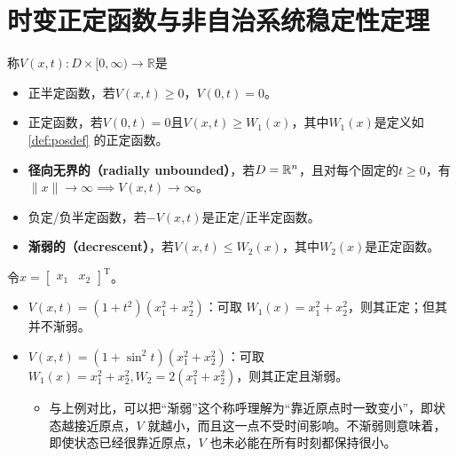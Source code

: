 \section{时变正定函数与非自治系统稳定性定理}\label{3Cref}
\begin{definition}
称$V(x,t): D \times [0, \infty) \rightarrow \mathbb{R}$是
    \begin{itemize}[leftmargin=1em]
      \item 正半定函数，若$V(x,t)\ge 0$，$V(0,t)=0$。
      \item 正定函数，若$V(0,t)=0$且$V(x,t)\ge W_1(x)$，其中$W_1(x)$是定义如 \ref{def:posdef} 的正定函数。
      \item {\bf 径向无界的（radially unbounded）}，若$D=\mathbb{R}{}^n$，且对每个固定的$t\ge0$，有$\|x\|\to\infty\implies V(x,t)\to\infty$。
      \item 负定/负半定函数，若$-V(x,t)$是正定/正半定函数。
      \item {\bf 渐弱的（decrescent）}，若$V(x,t)\le W_2(x)$，其中$W_2(x)$是正定函数。
    \end{itemize}
\end{definition}
\begin{example}[正定与渐弱]
    令$x = [\begin{array}{cc}
    x_1& x_2
  \end{array}]^\mathrm{T}$。
  \begin{itemize}[leftmargin=1em]
    \item $V (x, t) = (1 + t^2) (x^2_1 + x_2^2)$：可取 $W_1 (x) = x^2_1 +
    x^2_2$，则其正定；但其并不渐弱。
    
    \item $V (x, t) = (1 + \sin^2 t) (x^2_1 + x_2^2)$：可取$W_1 (x) = x^2_1 +
    x^2_2, W_2 = 2 (x^2_1 + x^2_2)$，则其正定且渐弱。
    \begin{itemize}
      \item 与上例对比，可以把“渐弱”这个称呼理解为“靠近原点时一致变小”，即状态越接近原点，\(V\) 就越小，而且这一点不受时间影响。不渐弱则意味着，即使状态已经很靠近原点，\(V\) 也未必能在所有时刻都保持很小。
    \end{itemize}
    
  \end{itemize}
\end{example}

